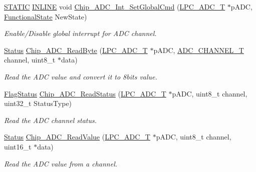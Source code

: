 \begin{DoxyCompactItemize}
\hyperlink{group__LPC__Types__Public__Macros_ga10b2d890d871e1489bb02b7e70d9bdfb}{S\+T\+A\+T\+IC} \hyperlink{group__LPC__Types__Public__Types_ga2eb6f9e0395b47b8d5e3eeae4fe0c116}{I\+N\+L\+I\+NE} void \hyperlink{group__ADC__17XX__40XX_gafa58ed3d91229dfcc78a5fc05dd4221b}{Chip\+\_\+\+A\+D\+C\+\_\+\+Int\+\_\+\+Set\+Global\+Cmd} (\hyperlink{structLPC__ADC__T}{L\+P\+C\+\_\+\+A\+D\+C\+\_\+T} $\ast$p\+A\+DC, \hyperlink{group__LPC__Types__Public__Types_gac9a7e9a35d2513ec15c3b537aaa4fba1}{Functional\+State} New\+State)
\begin{DoxyCompactList}\small\item\em Enable/\+Disable global interrupt for A\+DC channel. \end{DoxyCompactList}\item 
\hyperlink{group__LPC__Types__Public__Types_ga67a0db04d321a74b7e7fcfd3f1a3f70b}{Status} \hyperlink{group__ADC__17XX__40XX_ga5dc774072fa55b145e57a25c1a146535}{Chip\+\_\+\+A\+D\+C\+\_\+\+Read\+Byte} (\hyperlink{structLPC__ADC__T}{L\+P\+C\+\_\+\+A\+D\+C\+\_\+T} $\ast$p\+A\+DC, \hyperlink{group__ADC__17XX__40XX_ga30ee7058bc7cc1daff718b29b42bed4e}{A\+D\+C\+\_\+\+C\+H\+A\+N\+N\+E\+L\+\_\+T} channel, uint8\+\_\+t $\ast$data)
\begin{DoxyCompactList}\small\item\em Read the A\+DC value and convert it to 8bits value. \end{DoxyCompactList}\item 
\hyperlink{group__LPC__Types__Public__Types_ga89136caac2e14c55151f527ac02daaff}{Flag\+Status} \hyperlink{group__ADC__17XX__40XX_ga182ae98a23007564b3eaeb61a31ac553}{Chip\+\_\+\+A\+D\+C\+\_\+\+Read\+Status} (\hyperlink{structLPC__ADC__T}{L\+P\+C\+\_\+\+A\+D\+C\+\_\+T} $\ast$p\+A\+DC, uint8\+\_\+t channel, uint32\+\_\+t Status\+Type)
\begin{DoxyCompactList}\small\item\em Read the A\+DC channel status. \end{DoxyCompactList}\item 
\hyperlink{group__LPC__Types__Public__Types_ga67a0db04d321a74b7e7fcfd3f1a3f70b}{Status} \hyperlink{group__ADC__17XX__40XX_gab6374a3aa75b052970c472ee2e9f600e}{Chip\+\_\+\+A\+D\+C\+\_\+\+Read\+Value} (\hyperlink{structLPC__ADC__T}{L\+P\+C\+\_\+\+A\+D\+C\+\_\+T} $\ast$p\+A\+DC, uint8\+\_\+t channel, uint16\+\_\+t $\ast$data)
\begin{DoxyCompactList}\small\item\em Read the A\+DC value from a channel. \end{DoxyCompactList}\item 

\end{DoxyCompactItemize}

